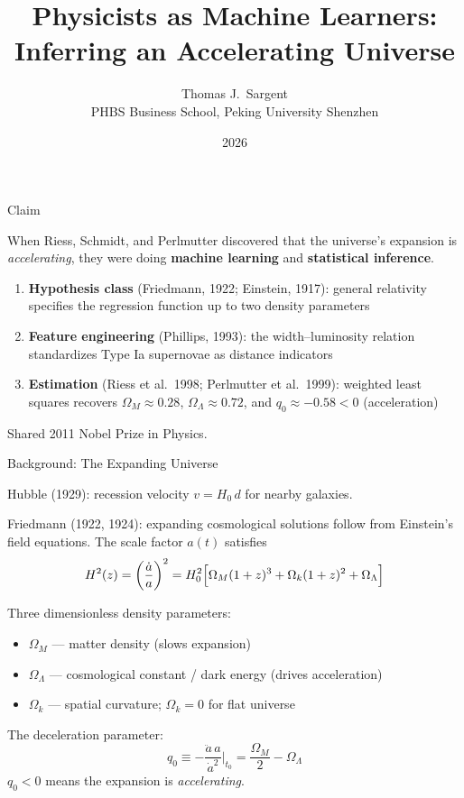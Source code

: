 \documentclass[aspectratio=169]{beamer}
\title{Physicists as Machine Learners:\\
{\normalsize Inferring an  Accelerating Universe}}
\author{Thomas J.\ Sargent \\ PHBS  Business School, Peking University Shenzhen }
\date{2026}
\begin{document}

\begin{frame}
  \titlepage
\end{frame}

\begin{frame}{Claim}

\begin{block}{}
When Riess, Schmidt, and Perlmutter discovered that the universe's
expansion is \emph{accelerating}, they were doing \textbf{machine learning}
and \textbf{statistical inference}.
\end{block}

\bigskip
\begin{enumerate}
  \item \textbf{Hypothesis class} (Friedmann, 1922; Einstein, 1917):
    general relativity specifies the regression function up to two
    density parameters
  \item \textbf{Feature engineering} (Phillips, 1993):
    the width--luminosity relation standardizes Type Ia supernovae
    as distance indicators
  \item \textbf{Estimation} (Riess et al.\ 1998; Perlmutter et al.\ 1999):
    weighted least squares recovers $\Omega_M \approx 0.28$,
    $\Omega_\Lambda \approx 0.72$, and $q_0 \approx -0.58 < 0$
    (acceleration)
\end{enumerate}

\bigskip
Shared  2011 Nobel Prize in Physics.

\end{frame}

\begin{frame}{Background: The Expanding Universe}

Hubble (1929): recession velocity $v = H_0\,d$ for nearby galaxies.

\medskip
Friedmann (1922, 1924): expanding cosmological solutions follow from
Einstein's field equations.  The scale factor $a(t)$ satisfies
\[
  H^2(z) = \left(\frac{\dot a}{a}\right)^2
  = H_0^2\Bigl[\Omega_M(1+z)^3 + \Omega_k(1+z)^2 + \Omega_\Lambda\Bigr]
\]

\medskip
Three dimensionless density parameters:
\begin{itemize}
  \item $\Omega_M$ --- matter density (slows expansion)
  \item $\Omega_\Lambda$ --- cosmological constant / dark energy
    (drives acceleration)
  \item $\Omega_k$ --- spatial curvature; $\Omega_k = 0$ for flat
    universe
\end{itemize}

\medskip
The deceleration parameter:
\[
  q_0 \equiv -\frac{\ddot a\,a}{\dot a^2}\bigg|_{t_0}
  = \frac{\Omega_M}{2} - \Omega_\Lambda
\]
$q_0 < 0$ means the expansion is \emph{accelerating}.

\end{frame}
\end{document}
